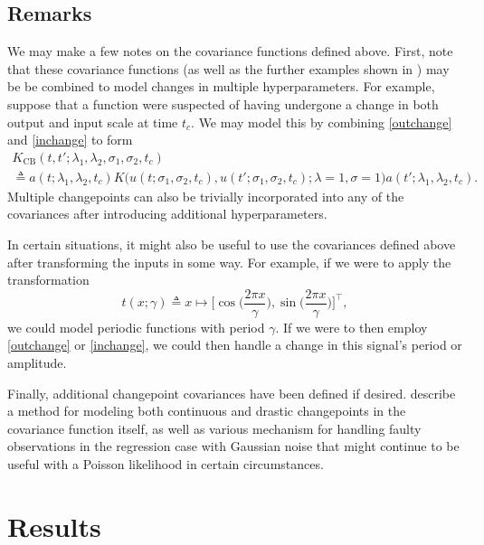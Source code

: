 \documentclass{article}
\newcommand{\deq}{\triangleq}
\begin{document}
\subsection{Remarks}

We may make a few notes on the covariance functions defined above.
First, note that these covariance functions (as well as the further
examples shown in \citep{cpcj, thesis}) may be be combined to model
changes in multiple hyperparameters.  For example, suppose that
a function were suspected of having undergone a change in both 
output and input scale at time $t_c$.  We may model this by combining
\eqref{outchange} and \eqref{inchange} to form
\begin{multline}
  \label{bothchange}
  K_{\text{CB}}
  (t, t'; \lambda_1, \lambda_2, \sigma_1, \sigma_2, t_c)
  \\
  \deq
  a(t; \lambda_1, \lambda_2, t_c)
  K
  \bigl(
    u(t; \sigma_1, \sigma_2, t_c),
    u(t'; \sigma_1, \sigma_2, t_c)
    ;
    \lambda = 1, \sigma = 1
  \bigr)
  a(t'; \lambda_1, \lambda_2, t_c).
\end{multline}
Multiple changepoints can also be trivially incorporated into any of
the covariances after introducing additional hyperparameters.

In certain situations, it might also be useful to use the covariances
defined above after transforming the inputs in some way.  For example,
if we were to apply the transformation
\begin{equation*}
  t(x; \gamma) 
  \deq 
  x 
  \mapsto 
  \Biggl[ 
    \cos \biggl( \frac{2 \pi x}{\gamma} \biggr),
    \sin \biggl( \frac{2 \pi x}{\gamma} \biggr)
  \Biggr]^\top,
\end{equation*}
we could model periodic functions with period $\gamma$.  If we were to
then employ \eqref{outchange} or \eqref{inchange}, we could then
handle a change in this signal's period or amplitude.

Finally, additional changepoint covariances have been defined if
desired.  \citet{cpcj} describe a method for modeling both continuous
and drastic changepoints in the covariance function itself, as well as
various mechanism for handling faulty observations in the regression
case with Gaussian noise that might continue to be useful with a
Poisson likelihood in certain circumstances.

\section{Results}
\label{results}
\end{document}
